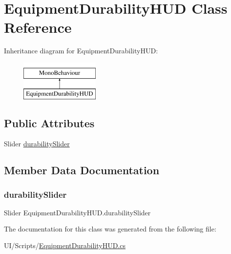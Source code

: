 \hypertarget{class_equipment_durability_h_u_d}{}\section{Equipment\+Durability\+H\+UD Class Reference}
\label{class_equipment_durability_h_u_d}
Inheritance diagram for Equipment\+Durability\+H\+UD\+:\begin{figure}[H]
\begin{center}
\leavevmode
\includegraphics[height=2.000000cm]{class_equipment_durability_h_u_d}
\end{center}
\end{figure}
\subsection*{Public Attributes}
\begin{DoxyCompactItemize}
\item 
Slider \mbox{\hyperlink{class_equipment_durability_h_u_d_a751773b40106d8a6879a415ac4feeb19}{durability\+Slider}}
\end{DoxyCompactItemize}


\subsection{Member Data Documentation}
\mbox{\label{class_equipment_durability_h_u_d_a751773b40106d8a6879a415ac4feeb19}} 
\subsubsection{\texorpdfstring{durability\+Slider}{durabilitySlider}}
{\footnotesize\ttfamily Slider Equipment\+Durability\+H\+U\+D.\+durability\+Slider}



The documentation for this class was generated from the following file\+:\begin{DoxyCompactItemize}
\item 
U\+I/\+Scripts/\mbox{\hyperlink{_equipment_durability_h_u_d_8cs}{Equipment\+Durability\+H\+U\+D.\+cs}}\end{DoxyCompactItemize}
